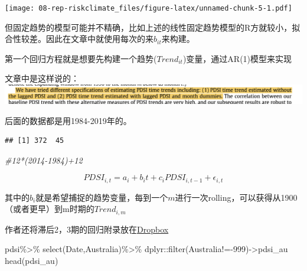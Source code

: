 \documentclass[
  oneside]{book}
\newenvironment{Shaded}{\begin{snugshade}}{\end{snugshade}}
\newcommand{\CommentTok}[1]{\textcolor[rgb]{0.56,0.35,0.01}{\textit{#1}}}
\newcommand{\DecValTok}[1]{\textcolor[rgb]{0.00,0.00,0.81}{#1}}
\newcommand{\FunctionTok}[1]{\textcolor[rgb]{0.00,0.00,0.00}{#1}}
\newcommand{\NormalTok}[1]{#1}
\newcommand{\OtherTok}[1]{\textcolor[rgb]{0.56,0.35,0.01}{#1}}
\newcommand{\SpecialCharTok}[1]{\textcolor[rgb]{0.00,0.00,0.00}{#1}}
\newcommand{\StringTok}[1]{\textcolor[rgb]{0.31,0.60,0.02}{#1}}
\begin{document}
\texttt{[image: 08-rep-riskclimate\_files/figure-latex/unnamed-chunk-5-1.pdf]}

但固定趋势的模型可能并不精确，比如上述的线性固定趋势模型的R方就较小，拟合性较差。因此在文章中就使用每次的来\(b_{it}\)来构建。

第一个回归方程就是想要先构建一个趋势(\(Trend_{it}\))变量，通过AR(1)模型来实现

文章中是这样说的：
\includegraphics{data/honglixu_2019/p1.png}

后面的数据都是用1984-2019年的。

\begin{Shaded}
\end{Shaded}

\begin{verbatim}
## [1] 372  45
\end{verbatim}

\begin{Shaded}
\begin{Highlighting}[]
\CommentTok{\#12*(2014{-}1984)+12}
\end{Highlighting}
\end{Shaded}

\begin{equation}
PDSI_{i,t} = a_i + b_{i}t+c_iPDSI_{i,t−1}+\epsilon_{i,t}
\tag{1}
\label{eq:1}
\end{equation}

其中的\(b_{i}\)就是希望捕捉的趋势变量，每到一个\(m\)进行一次rolling，可以获得从1900（或者更早）到m时期的\(Trend_{i,m}\)

作者还将滞后2，3期的回归附录放在\href{https://drive.google.com/file/d/0B0TDqU1VsbQNY0V1XzVFV0w5LW8/view?resourcekey=0-q8bSdARdVRdaCdbXMkfJkA}{Dropbox}

\begin{Shaded}
\begin{Highlighting}[]
\NormalTok{pdsi}\SpecialCharTok{\%\textgreater{}\%}
  \FunctionTok{select}\NormalTok{(Date,Australia)}\SpecialCharTok{\%\textgreater{}\%}
\NormalTok{  dplyr}\SpecialCharTok{::}\FunctionTok{filter}\NormalTok{(Australia}\SpecialCharTok{!={-}}\DecValTok{999}\NormalTok{)}\OtherTok{{-}\textgreater{}}\NormalTok{pdsi\_au}
\FunctionTok{head}\NormalTok{(pdsi\_au)}
\end{Highlighting}
\end{Shaded}
\end{document}
